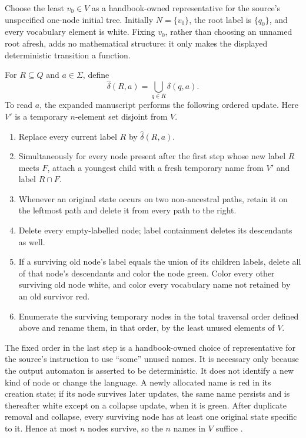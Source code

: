 Choose the least \(v_0\in V\) as a handbook-owned representative for the
source's unspecified one-node initial tree.  Initially \(N=\{v_0\}\), the
root label is \(\{q_0\}\), and every vocabulary element is white.  Fixing
\(v_0\), rather than choosing an unnamed root afresh, adds no mathematical
structure: it only makes the displayed deterministic transition a function.

For \(R\subseteq Q\) and \(a\in\Sigma\), define
\[
  \widehat\delta(R,a)=\bigcup_{q\in R}\delta(q,a).
\]
To read \(a\), the expanded manuscript performs the following ordered update.
Here \(V'\) is a temporary \(n\)-element set disjoint from \(V\).

\begin{enumerate}
\item Replace every current label \(R\) by
  \(\widehat\delta(R,a)\).
\item Simultaneously for every node present after the first step whose new
  label \(R\) meets \(F\), attach a youngest child with a fresh temporary name
  from \(V'\) and label \(R\cap F\).
\item Whenever an original state occurs on two non-ancestral paths, retain it
  on the leftmost path and delete it from every path to the right.
\item Delete every empty-labelled node; label containment deletes its
  descendants as well.
\item If a surviving old node's label equals the union of its children labels,
  delete all of that node's descendants and color the node green.  Color every
  other surviving old node white, and color every vocabulary name not retained
  by an old survivor red.
\item Enumerate the surviving temporary nodes in the total traversal order
  defined above and rename them, in that order, by the least unused elements
  of \(V\).
\end{enumerate}

The fixed order in the last step is a handbook-owned choice of representative
for the source's instruction to use ``some'' unused names.  It is necessary
only because the output automaton is asserted to be deterministic.  It does
not identify a new kind of node or change the language.  A newly allocated
name is red in its creation state; if its node survives later updates, the same
name persists and is thereafter white except on a collapse update, when it is
green.  After duplicate removal and collapse, every surviving node has at
least one original state specific to it.  Hence at most \(n\) nodes survive,
so the \(n\) names in \(V\) suffice
\cite[pp.~10--11]{Safra1995Extended}.

